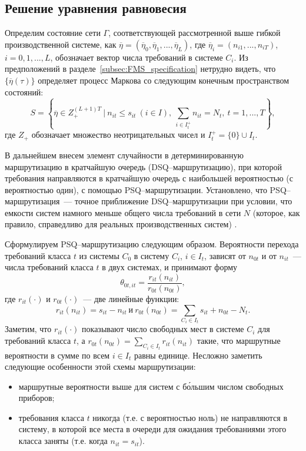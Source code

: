 \subsection{Решение уравнения равновесия}
\label{subsec:solution}

Определим состояние сети $\Gamma$, соответствующей рассмотренной выше гибкой производственной системе, как $\overline{\eta} = (\overline{\eta}_0, \overline{\eta}_1,...,\overline{\eta}_L)$, где $\overline{\eta}_i = (n_{i1},...,n_{iT})$, $i=0,1,...,L$, обозначает вектор числа требований в системе $C_i$. Из предположений в разделе~\ref{subsec:FMS_specification} нетрудно видеть, что $\{ \overline{\eta}(\tau) \}$ определяет процесс Маркова со следующим конечным пространством состояний:
\begin{equation}
 S = \left\lbrace \overline{\eta} \in Z_+^{(L+1)T} ~|~ n_{it} \leqslant s_{it} ~ (i \in I), ~
 \sum_{i \in I_t^+} n_{it} = N_{t}, ~ t=1,...,T \right\rbrace ,
 \label{eq:2.1}
\end{equation}
где $Z_+$ обозначает множество неотрицательных чисел и $I_t^+ = \{ 0 \} \cup I_t$.

В дальнейшем внесем элемент случайности в детерминированную маршрутизацию в кратчайшую очередь (DSQ--маршрутизацию), при которой требования направляются в кратчайшую очередь с наибольшей вероятностью (с вероятностью один), с помощью PSQ--маршрутизации. Установлено, что PSQ--маршрутизация~--- точное приближение DSQ--маршрутизации при условии, что емкости систем намного меньше общего числа требований в сети $N$ (которое, как правило, справедливо для реальных производственных систем) \cite{yao1}.

Сформулируем PSQ--маршрутизацию следующим образом. Вероятности перехода требований класса $t$ из системы $C_0$ в систему $C_i$, $i \in I_t$, зависят от $n_{0t}$ и от $n_{it}$~--- числа требований класса $t$ в двух системах, и принимают форму
\begin{equation}
 \theta_{0t,it} = \frac{r_{it}(n_{it})} {r_{0t}(n_{0t})},
\label{eq:2.2}
\end{equation}
где $r_{it}(\cdot)$ и $r_{0t}(\cdot)$~--- две линейные функции:
\begin{equation*}
 r_{it}(n_{it}) = s_{it} - n_{it} ~ \text{и} ~ r_{0t}(n_{0t}) = \sum_{C_i \in I_t} s_{it} + n_{0t} - N_t .
\end{equation*}
Заметим, что $r_{it}(\cdot)$ показывают число свободных мест в системе $C_i$ для требований класса $t$, а $r_{0t}(n_{0t}) = \sum\limits_{C_i \in I_t} r_{it}(n_{it})$ такие, что маршрутные вероятности в сумме по всем $i \in I_t$ равны единице. Несложно заметить следующие особенности этой схемы маршрутизации:
\begin{itemize}
\item маршрутные вероятности выше для систем с б\'{о}льшим числом свободных приборов;
\item требования класса $t$ никогда (т.е. с вероятностью ноль) не направляются в систему, в которой все места в очереди для ожидания требованиями этого класса заняты (т.е. когда $n_{it} = s_{it}$).
\end{itemize}

